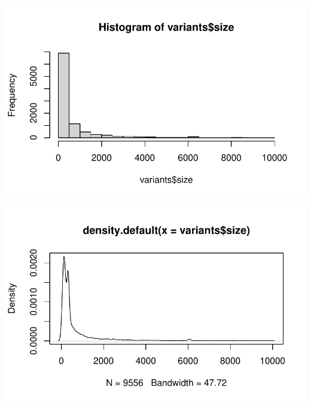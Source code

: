 \documentclass[
  letterpaper,
  DIV=11,
  numbers=noendperiod]{scrreprt}
\newenvironment{Shaded}{\begin{snugshade}}{\end{snugshade}}
\newcommand{\DocumentationTok}[1]{\textcolor[rgb]{0.37,0.37,0.37}{\textit{#1}}}
\newcommand{\FunctionTok}[1]{\textcolor[rgb]{0.28,0.35,0.67}{#1}}
\newcommand{\NormalTok}[1]{\textcolor[rgb]{0.00,0.23,0.31}{#1}}
\newcommand{\SpecialCharTok}[1]{\textcolor[rgb]{0.37,0.37,0.37}{#1}}
\begin{document}
\includegraphics{scripts/02_dataViz/class3_files/figure-pdf/unnamed-chunk-13-1.pdf}

\begin{Shaded}
\end{Shaded}

\includegraphics{scripts/02_dataViz/class3_files/figure-pdf/unnamed-chunk-13-2.pdf}

\begin{Shaded}
\end{Shaded}
\end{document}
